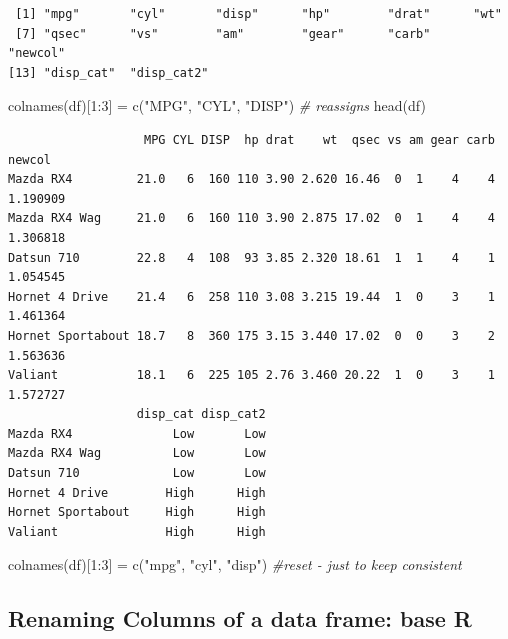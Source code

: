 \documentclass[
]{article}
\newenvironment{Shaded}{\begin{snugshade}}{\end{snugshade}}
\newcommand{\CommentTok}[1]{\textcolor[rgb]{0.56,0.35,0.01}{\textit{#1}}}
\newcommand{\DecValTok}[1]{\textcolor[rgb]{0.00,0.00,0.81}{#1}}
\newcommand{\FunctionTok}[1]{\textcolor[rgb]{0.00,0.00,0.00}{#1}}
\newcommand{\NormalTok}[1]{#1}
\newcommand{\OtherTok}[1]{\textcolor[rgb]{0.56,0.35,0.01}{#1}}
\newcommand{\SpecialCharTok}[1]{\textcolor[rgb]{0.00,0.00,0.00}{#1}}
\newcommand{\StringTok}[1]{\textcolor[rgb]{0.31,0.60,0.02}{#1}}
\begin{document}
\begin{verbatim}
 [1] "mpg"       "cyl"       "disp"      "hp"        "drat"      "wt"       
 [7] "qsec"      "vs"        "am"        "gear"      "carb"      "newcol"   
[13] "disp_cat"  "disp_cat2"
\end{verbatim}

\begin{Shaded}
\begin{Highlighting}[]
\FunctionTok{colnames}\NormalTok{(df)[}\DecValTok{1}\SpecialCharTok{:}\DecValTok{3}\NormalTok{] }\OtherTok{=} \FunctionTok{c}\NormalTok{(}\StringTok{"MPG"}\NormalTok{, }\StringTok{"CYL"}\NormalTok{, }\StringTok{"DISP"}\NormalTok{) }\CommentTok{\# reassigns}
\FunctionTok{head}\NormalTok{(df)}
\end{Highlighting}
\end{Shaded}

\begin{verbatim}
                   MPG CYL DISP  hp drat    wt  qsec vs am gear carb   newcol
Mazda RX4         21.0   6  160 110 3.90 2.620 16.46  0  1    4    4 1.190909
Mazda RX4 Wag     21.0   6  160 110 3.90 2.875 17.02  0  1    4    4 1.306818
Datsun 710        22.8   4  108  93 3.85 2.320 18.61  1  1    4    1 1.054545
Hornet 4 Drive    21.4   6  258 110 3.08 3.215 19.44  1  0    3    1 1.461364
Hornet Sportabout 18.7   8  360 175 3.15 3.440 17.02  0  0    3    2 1.563636
Valiant           18.1   6  225 105 2.76 3.460 20.22  1  0    3    1 1.572727
                  disp_cat disp_cat2
Mazda RX4              Low       Low
Mazda RX4 Wag          Low       Low
Datsun 710             Low       Low
Hornet 4 Drive        High      High
Hornet Sportabout     High      High
Valiant               High      High
\end{verbatim}

\begin{Shaded}
\begin{Highlighting}[]
\FunctionTok{colnames}\NormalTok{(df)[}\DecValTok{1}\SpecialCharTok{:}\DecValTok{3}\NormalTok{] }\OtherTok{=} \FunctionTok{c}\NormalTok{(}\StringTok{"mpg"}\NormalTok{, }\StringTok{"cyl"}\NormalTok{, }\StringTok{"disp"}\NormalTok{) }\CommentTok{\#reset {-} just to keep consistent}
\end{Highlighting}
\end{Shaded}

\hypertarget{renaming-columns-of-a-data-frame-base-r-1}{%
\subsection{Renaming Columns of a data frame: base
R}\label{renaming-columns-of-a-data-frame-base-r-1}}
\end{document}
